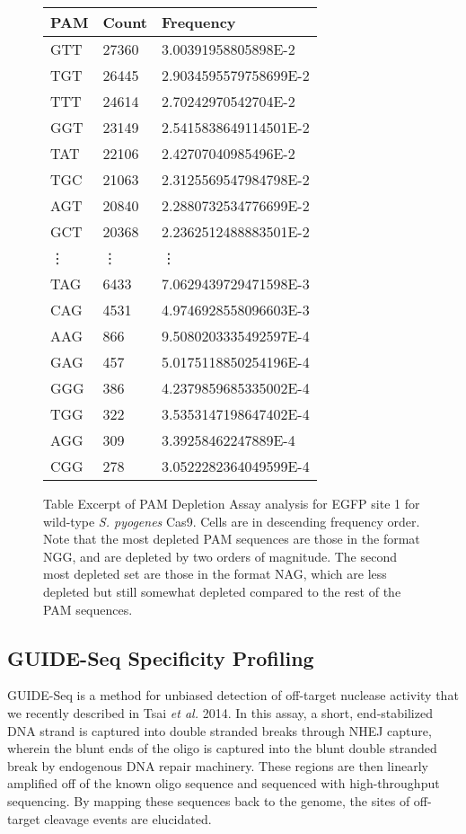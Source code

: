 \begin{figure}
\begin{center}
\begin{tabular}{ | l | l | l | }
\hline
	\textbf{PAM} & \textbf{Count} & \textbf{Frequency} \\ \hline
	GTT & 27360 & 3.00391958805898E-2 \\ \hline
	TGT & 26445 & 2.9034595579758699E-2 \\ \hline
	TTT & 24614 & 2.70242970542704E-2 \\ \hline
	GGT & 23149 & 2.5415838649114501E-2 \\ \hline
	TAT & 22106 & 2.42707040985496E-2 \\ \hline
	TGC & 21063 & 2.3125569547984798E-2 \\ \hline
	AGT & 20840 & 2.2880732534776699E-2 \\ \hline
	GCT & 20368 & 2.2362512488883501E-2 \\ \hline
	\vdots & \vdots & \vdots \\ \hline
	TAG & 6433 & 7.0629439729471598E-3 \\ \hline
	CAG & 4531 & 4.9746928558096603E-3 \\ \hline
	AAG & 866 & 9.5080203335492597E-4 \\ \hline
	GAG & 457 & 5.0175118850254196E-4 \\ \hline
	GGG & 386 & 4.2379859685335002E-4 \\ \hline
	TGG & 322 & 3.5353147198647402E-4 \\ \hline
	AGG & 309 & 3.39258462247889E-4 \\ \hline
	CGG & 278 & 3.0522282364049599E-4 \\ \hline
\end{tabular}
\caption{Table Excerpt of PAM Depletion Assay analysis for EGFP site 1 for wild-type \textit{S. pyogenes} Cas9. Cells are in descending frequency order. Note that the most depleted PAM sequences are those in the format NGG, and are depleted by two orders of magnitude. The second most depleted set are those in the format NAG, which are less depleted but still somewhat depleted compared to the rest of the PAM sequences.}
\end{center}
\end{figure}

\newpage
\subsection{GUIDE-Seq Specificity Profiling}
GUIDE-Seq is a method for unbiased detection of off-target nuclease activity that we recently described in Tsai \textit{et al.} 2014. In this assay, a short, end-stabilized DNA strand is captured into double stranded breaks through NHEJ capture, wherein the blunt ends of the oligo is captured into the blunt double stranded break by endogenous DNA repair machinery. These regions are then linearly amplified off of the known oligo sequence and sequenced with high-throughput sequencing. By mapping these sequences back to the genome, the sites of off-target cleavage events are elucidated.

